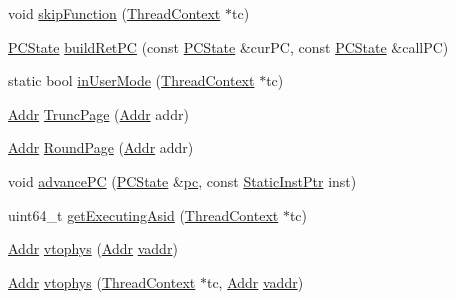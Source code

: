 \begin{DoxyCompactItemize}
\item 
void \hyperlink{namespaceMipsISA_a2624d7d8bac3eb03de2eb6e83903c208}{skipFunction} (\hyperlink{classThreadContext}{ThreadContext} $\ast$tc)
\item 
\hyperlink{classGenericISA_1_1DelaySlotPCState}{PCState} \hyperlink{namespaceMipsISA_a2f28a29005a886eacf4d9d5c44ca111e}{buildRetPC} (const \hyperlink{classGenericISA_1_1DelaySlotPCState}{PCState} \&curPC, const \hyperlink{classGenericISA_1_1DelaySlotPCState}{PCState} \&callPC)
\item 
static bool \hyperlink{namespaceMipsISA_a1afb0b4065513135cf7543096d80cfc4}{inUserMode} (\hyperlink{classThreadContext}{ThreadContext} $\ast$tc)
\item 
\hyperlink{classm5_1_1params_1_1Addr}{Addr} \hyperlink{namespaceMipsISA_afef87a2ebf00c4afe79598bf404860c7}{TruncPage} (\hyperlink{classm5_1_1params_1_1Addr}{Addr} addr)
\item 
\hyperlink{classm5_1_1params_1_1Addr}{Addr} \hyperlink{namespaceMipsISA_a3cf1a9ff2ed57d6ae150519212096c13}{RoundPage} (\hyperlink{classm5_1_1params_1_1Addr}{Addr} addr)
\item 
void \hyperlink{namespaceMipsISA_a8029c9215d2beac3c8658dd94e492b7e}{advancePC} (\hyperlink{classGenericISA_1_1DelaySlotPCState}{PCState} \&\hyperlink{namespaceMipsISA_a70af401addf580de8d9ddd8af1165481}{pc}, const \hyperlink{classRefCountingPtr}{StaticInstPtr} inst)
\item 
uint64\_\-t \hyperlink{namespaceMipsISA_ada6b2a9f08bac266b15f41ee721aca4b}{getExecutingAsid} (\hyperlink{classThreadContext}{ThreadContext} $\ast$tc)
\item 
\hyperlink{classm5_1_1params_1_1Addr}{Addr} \hyperlink{namespaceMipsISA_a3828815371ad2b0a1be60abdcb405cf9}{vtophys} (\hyperlink{classm5_1_1params_1_1Addr}{Addr} \hyperlink{namespaceMipsISA_ac78d9788b3f9a366df64485c9afaf1b1}{vaddr})
\item 
\hyperlink{classm5_1_1params_1_1Addr}{Addr} \hyperlink{namespaceMipsISA_ad4bbbca3210dee66152520984c3aac6a}{vtophys} (\hyperlink{classThreadContext}{ThreadContext} $\ast$tc, \hyperlink{classm5_1_1params_1_1Addr}{Addr} \hyperlink{namespaceMipsISA_ac78d9788b3f9a366df64485c9afaf1b1}{vaddr})
\end{DoxyCompactItemize}
